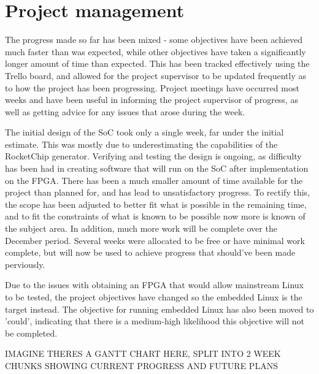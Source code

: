 \section{Project management}
The progress made so far has been mixed - some objectives have been achieved much faster than was expected, while other objectives have taken a significantly longer amount of time than expected. This has been tracked effectively using the Trello\cite{} board, and allowed for the project supervisor to be updated frequently as to how the project has been progressing. Project meetings have occurred most weeks and have been useful in informing the project supervisor of progress, as well as getting advice for any issues that arose during the week.

The initial design of the SoC took only a single week, far under the initial estimate. This was mostly due to underestimating the capabilities of the RocketChip generator. Verifying and testing the design is ongoing, as difficulty has been had in creating software that will run on the SoC after implementation on the FPGA. There has been a much smaller amount of time available for the project than planned for, and has lead to unsatisfactory progress. To rectify this, the scope has been adjusted to better fit what is possible in the remaining time, and to fit the constraints of what is known to be possible now more is known of the subject area. In addition, much more work will be complete over the December period. Several weeks were allocated to be free or have minimal work complete, but will now be used to achieve progress that should've been made perviously.

Due to the issues with obtaining an FPGA that would allow mainstream Linux to be tested, the project objectives have changed so the embedded Linux is the target instead. The objective for running embedded Linux has also been moved to 'could', indicating that there is a medium-high likelihood this objective will not be completed.

IMAGINE THERES A GANTT CHART HERE, SPLIT INTO 2 WEEK CHUNKS SHOWING CURRENT PROGRESS AND FUTURE PLANS